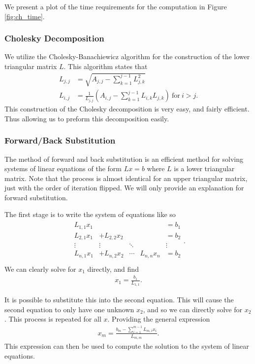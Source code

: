 \documentclass[../fem.tex]{subfiles}
\begin{document}
We present a plot of the time requirements for the computation in
Figure \ref{fig:ch_time}.

\subsubsection{Cholesky Decomposition}%
\label{ssub:cholesky_decomposition}


We utilize the Cholesky-Banachiewicz algorithm for the construction of the
lower triangular matrix $L$. This algorithm states that
\begin{align*}
  L_{j,j}&=\sqrt{A_{j,j}-\sum_{k=1}^{j-1}L_{j,k}^2}\\
  L_{i,j}&=\frac{1}{L_{j,j}}\left(A_{i,j}-\sum_{k=1}^{j-1}L_{i,k}L_{j,k}\right)\
  \text{for}\ i>j.
\end{align*}
This construction of the Cholesky decomposition is very easy, and fairly
efficient. Thus allowing us to preform this decomposition easily.

\subsubsection{Forward/Back Substitution}%
\label{ssub:forward_back_substitution}

The method of forward and back substitution is an efficient method for solving
systems of linear equations of the form $Lx=b$ where $L$ is a lower triangular
matrix. Note that the process is almost identical for an upper triangular
matrix, just with the order of iteration flipped. We will only provide an
explanation for forward substitution.

The first stage is to write the system of equations like so
\begin{align*}
  \begin{matrix}
    L_{1,1}x_1 & & & & =b_1\\
    L_{2,1}x_1 & +L_{2,2}x_2 & & & =b_2\\
    \vdots & \vdots & \ddots & & \vdots\\
    L_{n,1}x_1 & +L_{n,2}x_2 & \cdots & L_{n,n}x_n & =b_2\\
  \end{matrix}.
\end{align*}
We can clearly solve for $x_1$ directly, and find
\begin{align*}
  x_1=\frac{b_1}{L_{1,1}}.
\end{align*}

It is possible to substitute this into the second equation. This will cause the
second equation to only have one unknown $x_2$, and so we can directly solve
for $x_2$. This process is repeated for all $x$. Providing the general
expression
\begin{align*}
  x_m=\frac{b_m-\sum_{i=1}^{m-1}L_{m,i}x_i}{L_{m,m}}.
\end{align*}
This expression can then be used to compute the solution to the system of
linear equations.
\end{document}
